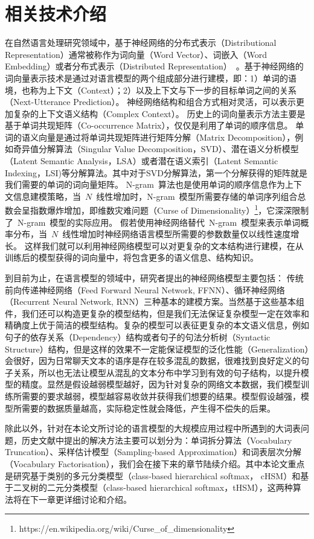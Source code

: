 \chapter{相关技术介绍}
在自然语言处理研究领域中，基于神经网络的分布式表示（Distributional Representation）通常被称作为词向量（Word Vector）、词嵌入（Word Embedding）或者分布式表示（Distributed Representation）~。基于神经网络的词向量表示技术是通过对语言模型的两个组成部分进行建模，即：1）单词的语境，也称为上下文（Context）；2）以及上下文与下一步的目标单词之间的关系（Next-Utterance Prediction）。
神经网络结构和组合方式相对灵活，可以表示更加复杂的上下文语义结构（Complex Context）。
历史上的词向量表示方法主要是基于单词共现矩阵（Co-occurrence Matrix），仅仅是利用了单词的顺序信息。
单词的语义向量是通过将单词共现矩阵进行矩阵分解（Matrix Decomposition），例如奇异值分解算法（Singular Value Decomposition，SVD）、潜在语义分析模型（Latent Semantic Analysis，LSA）或者潜在语义索引（Latent Semantic Indexing，LSI)等分解算法。其中对于SVD分解算法，第一个分解获得的矩阵就是我们需要的单词的词向量矩阵。
N-gram~算法也是使用单词的顺序信息作为上下文信息建模策略，当~$N$~线性增加时，N-gram~模型所需要存储的单词序列组合总数会呈指数爆炸增加，即维数灾难问题（Curse of Dimensionality）\footnote{https://en.wikipedia.org/wiki/Curse\_of\_dimensionality}，它深深限制了~N-gram~模型的实际应用。
假若使用神经网络替代~N-gram~模型来表示单词概率分布，当~$N$~线性增加时神经网络语言模型所需要的参数数量仅以线性速度增长。
这样我们就可以利用神经网络模型可以对更复杂的文本结构进行建模，在从训练后的模型获得的词向量中，将包含更多的语义信息、结构知识。

到目前为止，在语言模型的领域中，研究者提出的神经网络模型主要包括： 传统前向传递神经网络（Feed Forward Neural Network, FFNN）、循环神经网络（Recurrent Neural Network, RNN）三种基本的建模方案。当然基于这些基本组件，我们还可以构造更复杂的模型结构，但是我们无法保证复杂模型一定在效率和精确度上优于简洁的模型结构。复杂的模型可以表征更复杂的本文语义信息，例如句子的依存关系（Dependency）结构或者句子的句法分析树（Syntactic Structure）结构，但是这样的效果不一定能保证模型的泛化性能（Generalization）会很好，因为日常聊天文本的语序是存在较多混乱的数据，很难找到良好定义的句子关系，所以也无法让模型从混乱的文本分布中学习到有效的句子结构，以提升模型的精度。显然是假设越弱模型越好，因为针对复杂的网络文本数据，我们模型训练所需要的要求越弱，模型越容易收敛并获得我们想要的结果。模型假设越强，模型所需要的数据质量越高，实际稳定性就会降低，产生得不偿失的后果。


除此以外，针对在本论文所讨论的语言模型的大规模应用过程中所遇到的大词表问题，历史文献中提出的解决方法主要可以划分为：单词拆分算法（Vocabulary Truncation）、采样估计模型（Sampling-based Approximation）和词表层次分解（Vocabulary Factorisation），我们会在接下来的章节陆续介绍。其中本论文重点是研究基于类别的多元分类模型（class-based hierarchical softmax， cHSM）和基于二叉树的二元分类模型（class-based hierarchical softmax，tHSM），这两种算法将在下一章更详细讨论和介绍。

